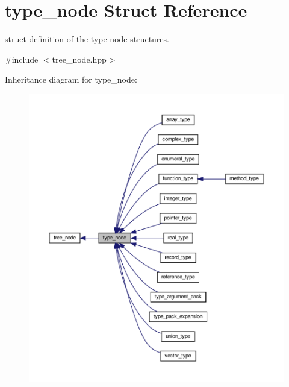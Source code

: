 \hypertarget{structtype__node}{}\section{type\+\_\+node Struct Reference}
\label{structtype__node}


struct definition of the type node structures.  




{\ttfamily \#include $<$tree\+\_\+node.\+hpp$>$}



Inheritance diagram for type\+\_\+node\+:
\nopagebreak
\begin{figure}[H]
\begin{center}
\leavevmode
\includegraphics[width=350pt]{d1/d59/structtype__node__inherit__graph}
\end{center}
\end{figure}


